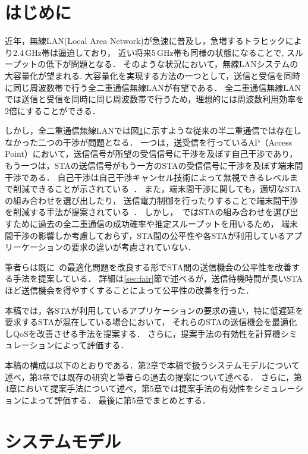 \documentclass[technicalreport]{ieicej}
\begin{document}
\section{はじめに}\label{sec:intro}
	近年，無線LAN(Local Area Network)が急速に普及し，急増するトラヒックにより2.4\,GHz帯は逼迫しており，
	近い将来5\,GHz帯も同様の状態になることで, スループットの低下が問題となる．
	そのような状況において，無線LANシステムの大容量化が望まれる.
	大容量化を実現する方法の一つとして，送信と受信を同時に同じ周波数帯で行う全二重通信無線LANが有望である．
	全二重通信無線LANでは送信と受信を同時に同じ周波数帯で行うため，理想的には周波数利用効率を2倍にすることができる．
	\par
	しかし，全二重通信無線LANでは図\ref{fig:topology}に示すような従来の半二重通信では存在しなかった二つの干渉が問題となる．
	一つは，送受信を行っているAP（Access Point）において，送信信号が所望の受信信号に干渉を及ぼす自己干渉であり，
	もう一つは，STAの送信信号がもう一方のSTAの受信信号に干渉を及ぼす端末間干渉である．
	自己干渉は自己干渉キャンセル技術によって無視できるレベルまで削減できることが示されている~\cite{fdmac, stanford1}．
	また，端末間干渉に関しても，適切なSTAの組み合わせを選び出したり，
	送信電力制御を行ったりすることで端末間干渉を削減する手法が提案されている~\cite{contra, promac}．
	しかし，~\cite{contra, promac}ではSTAの組み合わせを選び出すために過去の全二重通信の成功確率や推定スループットを用いるため，
	端末間干渉の影響しか考慮しておらず，STA間の公平性や各STAが利用しているアプリーケーションの要求の違いが考慮されていない．
	\par
	筆者らは既に~\cite{promac}の最適化問題を改良する形でSTA間の送信機会の公平性を改善する手法を提案している．
	詳細は\ref{sec:fair}節で述べるが，送信待機時間が長いSTAほど送信機会を得やすくすることによって公平性の改善を行った．
	\par
	本稿では，各STAが利用しているアプリケーションの要求の違い，特に低遅延を要求するSTAが混在している場合において，
	それらのSTAの送信機会を最適化しQoSを改善させる手法を提案する．
	さらに，提案手法の有効性を計算機シミュレーションによって評価する．
	\par
	本稿の構成は以下のとおりである．第2章で本稿で扱うシステムモデルについて述べ，第3章では既存の研究と筆者らの過去の提案について述べる．
	さらに，第4章において提案手法について述べ，第5章では提案手法の有効性をシミュレーションによって評価する．
	最後に第5章でまとめとする．

\section{システムモデル}
	\begin{figure}[t]
		\centering
		\label{fig:topology}
	\end{figure}
	\begin{figure}[t]
		\centering
		\label{fig:model}
	\end{figure}
\end{document}
